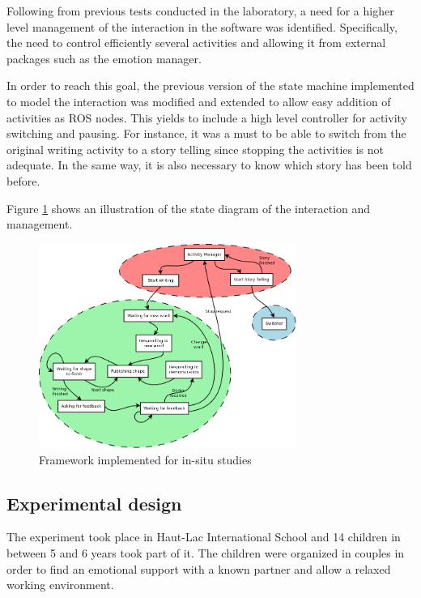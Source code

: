 Following from previous tests conducted in the laboratory, a need for a higher level management of the interaction in the software was identified. Specifically, the need to control efficiently several activities and allowing it from external packages such as the emotion manager.

In order to reach this goal, the previous version of the state machine implemented to model the interaction \cite{hood2015children} was modified and extended to allow easy addition of activities as ROS nodes. This yields to include a high level controller for activity switching and pausing. For instance, it was a must to be able to switch from the original writing activity to a story telling since stopping the activities is not adequate. In the same way, it is also necessary to know which story has been told before.

Figure \ref{fig:stateMachine} shows an illustration of the state diagram of the interaction and management.

\begin{figure}[h!]
        \centering
        \includegraphics[width=0.75\textwidth]{figures/stateMachine.png}
        \caption{Framework implemented for in-situ studies}
        \label{fig:stateMachine}
\end{figure}

\subsection{Experimental design}

The experiment took place in Haut-Lac International School and 14 children in between 5 and 6 years took part of it. The children were organized in couples in order to find an emotional support with a known partner and allow a relaxed working environment.

